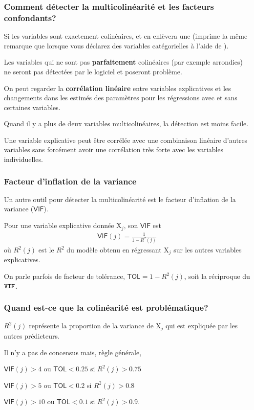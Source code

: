 \documentclass[xcolor={dvipsnames}]{beamer}
\begin{document}
\begin{frame}[fragile]
\frametitle{Comment détecter la multicolinéarité et les facteurs confondants?}
\bi
\item Si les variables sont exactement colinéaires, \SASlang et \Rlang en enlèvera une {\footnotesize (\SASlang imprime la même remarque que lorsque vous déclarez des variables catégorielles à l'aide de  )}.
\bi 
\item Les variables qui ne sont pas \textbf{parfaitement} colinéaires (par exemple arrondies) ne seront pas détectées par le logiciel et poseront problème.
\ei
\item On peut regarder la \textbf{corrélation linéaire} entre \alert{variables explicatives} et les changements dans les estimés des paramètres pour les régressions avec et sans certaines variables.
\item Quand il y a plus de deux variables multicolinéaires, la détection est moins facile.
\item Une variable explicative peut être corrélée avec une combinaison linéaire d'autres variables sans forcément avoir une corrélation très forte avec les variables individuelles. 

\ei
\end{frame}

\begin{frame}
\frametitle{Facteur d'inflation de la variance}

\bi
\item Un autre outil pour détecter la multicolinéarité est le facteur d'inflation de la variance ($\mathsf{VIF}$). 
\item Pour une variable explicative donnée $\mathrm{X}_j$, son $\mathsf{VIF}$ est
\begin{align*}
\mathsf{VIF}(j)=\frac{1}{1-R^2(j)}
\end{align*}
où $R^2(j)$ est le $R^2$ du modèle obtenu en régressant $\mathrm{X}_j$ sur les autres variables explicatives.
 \item On parle parfois de facteur de tolérance, $\mathsf{TOL}=1-R^2(j)$, soit la réciproque du $\texttt{VIF}$.
 \ei
 \end{frame}
 \begin{frame}
 \frametitle{Quand est-ce que la colinéarité est problématique?}
 \bi
\item $R^2(j)$ représente la proportion de la variance de $\mathrm{X}_j$ qui est expliquée par les autres prédicteurs.

\item Il n'y a pas de concensus mais, règle générale, 
\bi 
\item $\mathsf{VIF}(j) > 4$ ou $\mathsf{TOL} < 0.25$ si $R^2(j) >0.75$
\item $\mathsf{VIF}(j) > 5$ ou $\mathsf{TOL} < 0.2$ si $R^2(j) >0.8$
\item $\mathsf{VIF}(j) > 10$ ou $\mathsf{TOL} < 0.1$ si  $R^2(j) >0.9$.
\ei
\ei
\end{frame}
\end{document}
